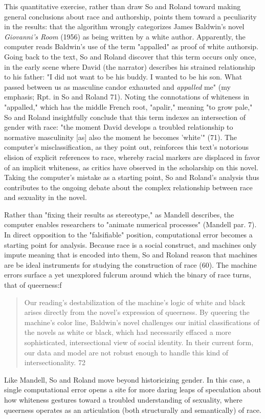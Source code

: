 \documentclass[11pt]{article}
\begin{document}
This quantitative exercise, rather than draw So and Roland toward
making general conclusions about race and authorship, points them
toward a peculiarity in the results: that the algorithm wrongly
categorizes James Baldwin's novel \emph{Giovanni's Room} (1956) as being
written by a white author. Apparently, the computer reads Baldwin's
use of the term "appalled" as proof of white authorsip. Going back to
the text, So and Roland discover that this term occurs only once, in
the early scene where David (the narrator) describes his strained
relationship to his father: "I did not want to be his buddy. I wanted
to be his son. What passed between us as masculine candor exhausted
and \emph{appalled} me" (my emphasis; Rpt. in So and Roland 71). Noting the
connotations of whiteness in "appalled," which has the middle French
root, "apalir," meaning "to grow pale," So and Roland insightfully
conclude that this term indexes an intersection of gender with race:
"the moment David develops a troubled relationship to normative
masculinity [as] also the moment he becomes 'white'" (71). The
computer's misclassification, as they point out, reinforces this
text's notorious elision of explicit references to race, whereby
racial markers are displaced in favor of an implicit whiteness, as
critics have observed in the scholarship on this novel. Taking the
computer's mistake as a starting point, So and Roland's analysis thus
contributes to the ongoing debate about the complex relationship
between race and sexuality in the novel.

Rather than "fixing their results as stereotype," as Mandell
describes, the computer enables researchers to "animate numerical
processes" (Mandell par. 7). In direct opposition to the "falsifiable"
position, computational error becomes a starting point for
analysis. Because race is a social construct, and machines only impute
meaning that is encoded into them, So and Roland reason that machines
are be ideal instruments for studying the construction of race
(60). The machine errors surface a yet unexplored fulcrum around which
the binary of race turns, that of queerness:f
\begin{quote}
Our reading’s destabilization of the machine’s logic of white and
black arises directly from the novel’s expression of queerness. By
queering the machine’s color line, Baldwin’s novel challenges our
initial classifications of the novels as white or black, which had
necessarily effaced a more sophisticated, intersectional view of
social identity. In their current form, our data and model are not
robust enough to handle this kind of intersectionality. 72
\end{quote}
Like Mandell, So and Roland move beyond historicizing gender. In this
case, a single computational error opens a site for more daring leaps
of speculation about how whiteness gestures toward a troubled
understanding of sexuality, where queerness operates as an
articulation (both structurally and semantically) of race.
\end{document}
